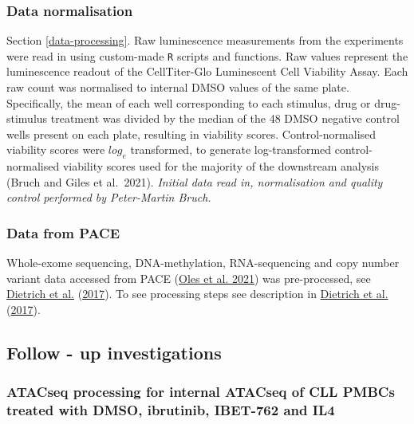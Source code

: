 \documentclass[11pt, a4paper, twosided]{book}
\begin{document}
\hypertarget{data-normalisation}{%
\subsubsection{Data normalisation}\label{data-normalisation}}

Section \ref{data-processing}. Raw luminescence measurements from the experiments were read in using custom-made \texttt{R} scripts and functions. Raw values represent the luminescence readout of the CellTiter-Glo Luminescent Cell Viability Assay. Each raw count was normalised to internal DMSO values of the same plate. Specifically, the mean of each well corresponding to each stimulus, drug or drug-stimulus treatment was divided by the median of the 48 DMSO negative control wells present on each plate, resulting in viability scores. Control-normalised viability scores were \(log_{e}\) transformed, to generate log-transformed control-normalised viability scores used for the majority of the downstream analysis (Bruch and Giles et al.~2021). \emph{Initial data read in, normalisation and quality control performed by Peter-Martin Bruch.}

\hypertarget{data-from-pace}{%
\subsubsection{Data from PACE}\label{data-from-pace}}

Whole-exome sequencing, DNA-methylation, RNA-sequencing and copy number variant data accessed from PACE (\protect\hyperlink{ref-R-BloodCancerMultiOmics2017}{Oles et al. 2021}) was pre-processed, see \protect\hyperlink{ref-JCIpaper}{Dietrich et al.} (\protect\hyperlink{ref-JCIpaper}{2017}). To see processing steps see description in \protect\hyperlink{ref-JCIpaper}{Dietrich et al.} (\protect\hyperlink{ref-JCIpaper}{2017}).

\hypertarget{follow---up-investigations-1}{%
\subsection{Follow - up investigations}\label{follow---up-investigations-1}}

\hypertarget{atacseq-processing-for-internal-atacseq-of-cll-pmbcs-treated-with-dmso-ibrutinib-ibet-762-and-il4}{%
\subsubsection{ATACseq processing for internal ATACseq of CLL PMBCs treated with DMSO, ibrutinib, IBET-762 and IL4}\label{atacseq-processing-for-internal-atacseq-of-cll-pmbcs-treated-with-dmso-ibrutinib-ibet-762-and-il4}}
\end{document}
